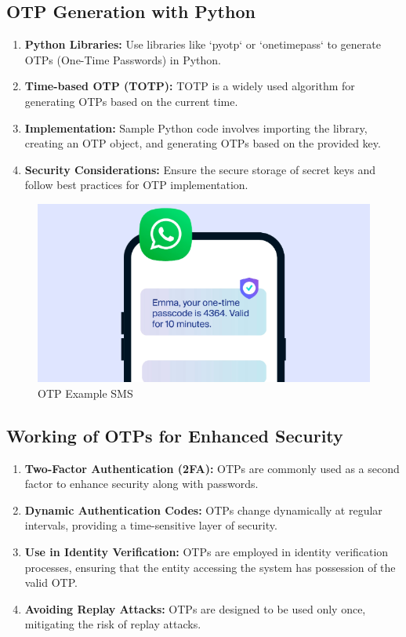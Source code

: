 \documentclass[11pt]{article}
\begin{document}
\subsection{OTP Generation with Python}
\begin{enumerate}
    \item \textbf{Python Libraries:} Use libraries like `pyotp` or `onetimepass` to generate OTPs (One-Time Passwords) in Python.

    \item \textbf{Time-based OTP (TOTP):} TOTP is a widely used algorithm for generating OTPs based on the current time.

    \item \textbf{Implementation:} Sample Python code involves importing the library, creating an OTP object, and generating OTPs based on the provided key.

    \item \textbf{Security Considerations:} Ensure the secure storage of secret keys and follow best practices for OTP implementation.

\end{enumerate}

\begin{figure}[H]
    \centering
    \includegraphics[width=.75\textwidth]{otp.png}
    \caption{OTP Example SMS}
\end{figure}

\subsection{Working of OTPs for Enhanced Security}
\begin{enumerate}
    \item \textbf{Two-Factor Authentication (2FA):} OTPs are commonly used as a second factor to enhance security along with passwords.

    \item \textbf{Dynamic Authentication Codes:} OTPs change dynamically at regular intervals, providing a time-sensitive layer of security.

    \item \textbf{Use in Identity Verification:} OTPs are employed in identity verification processes, ensuring that the entity accessing the system has possession of the valid OTP.

    \item \textbf{Avoiding Replay Attacks:} OTPs are designed to be used only once, mitigating the risk of replay attacks.
\end{enumerate}
\end{document}
